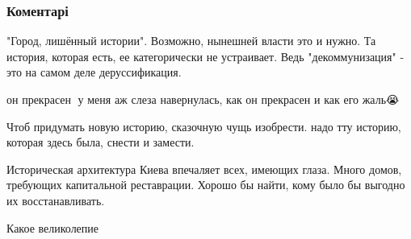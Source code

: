  
 
 
 
 
\subsubsection{Коментарі}
\label{sec:05_07_2021.fb.krivda_anna.1.zdanija_obajanie.cmt}

\begin{itemize}
 
"Город, лишённый истории". Возможно, нынешней власти это и нужно. Та история,
которая есть, ее категорически не устраивает. Ведь "декоммунизация" - это на
самом деле деруссификация.

 
он прекрасен🖤
у меня аж слеза навернулась, как он прекрасен и как его жаль😭🖤

 
Чтоб придумать новую историю, сказочную чущь изобрести. надо тту историю, которая здесь была, снести и замести.

 
Историческая архитектура Киева впечаляет всех, имеющих глаза. Много домов, требующих капитальной реставрации. Хорошо бы найти, кому было бы выгодно их восстанавливать.

 
Какое великолепие
\end{itemize}

